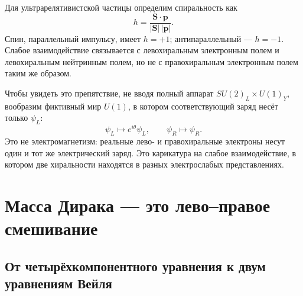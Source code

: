 Для ультрарелятивистской частицы определим спиральность как
\begin{equation}
  h=\frac{\bm S\cdot\bm p}{|\bm S|\,|\bm p|}.
\end{equation}
Спин, параллельный импульсу, имеет \(h=+1\); антипараллельный — \(h=-1\). Слабое взаимодействие связывается с левохиральным электронным полем и левохиральным нейтринным полем, но не с правохиральным электронным полем таким же образом.

Чтобы увидеть это препятствие, не вводя полный аппарат \(SU(2)_L\times U(1)_Y\), вообразим фиктивный мир \(U(1)\), в котором соответствующий заряд несёт только \(\psi_L\):
\begin{equation}
  \psi_L\longmapsto e^{i\theta}\psi_L,
  \qquad
  \psi_R\longmapsto\psi_R .
  \label{eq:l09-chiral-toy-charge}
\end{equation}
Это не электромагнетизм: реальные лево- и правохиральные электроны несут один и тот же электрический заряд. Это карикатура на слабое взаимодействие, в котором две хиральности находятся в разных электрослабых представлениях.

\begin{classroomqa}
\end{classroomqa}

\section{Масса Дирака — это лево--правое смешивание}

\subsection{От четырёхкомпонентного уравнения к двум уравнениям Вейля}

